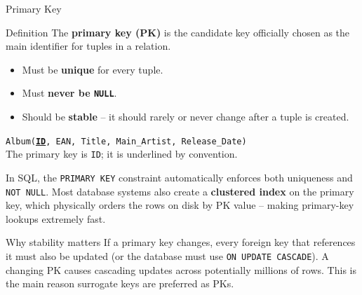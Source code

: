 \begin{frame}{Primary Key}
  \begin{block}{Definition}
    The \textbf{primary key (PK)} is the candidate key officially chosen
    as the main identifier for tuples in a relation.
    \begin{itemize}
      \item Must be \textbf{unique} for every tuple.
      \item Must \textbf{never be \texttt{NULL}}.
      \item Should be \textbf{stable} -- it should rarely or never change
            after a tuple is created.
    \end{itemize}
  \end{block}

  \begin{examples}{}
    \texttt{Album(\textbf{\underline{ID}}, EAN, Title, Main\_Artist, Release\_Date)}\\
    The primary key is \texttt{ID}; it is underlined by convention.
  \end{examples}

  In SQL, the \texttt{PRIMARY KEY} constraint automatically enforces both
  uniqueness and \texttt{NOT NULL}.  Most database systems also create a
  \textbf{clustered index} on the primary key, which physically orders
  the rows on disk by PK value -- making primary-key lookups extremely fast.

  \begin{alertblock}{Why stability matters}
    If a primary key changes, every foreign key that references it must
    also be updated (or the database must use \texttt{ON UPDATE CASCADE}).
    A changing PK causes cascading updates across potentially millions of
    rows.  This is the main reason surrogate keys are preferred as PKs.
  \end{alertblock}
\end{frame}

